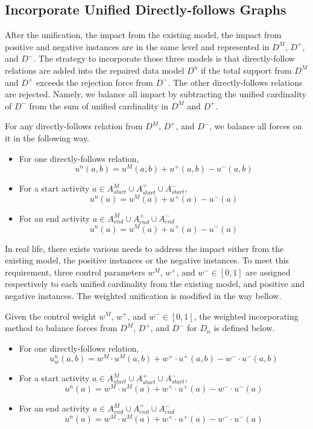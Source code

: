 \subsection{Incorporate Unified Directly-follows Graphs}
After the unification, the impact from the existing model, the impact from positive and negative instances are in the same level and represented in $D^M$, $D^+$, and $D^-$. 
The strategy to incorporate those three models is that directly-follow relations are added into the repaired data model $D^n$ if the total support from $D^M$ and $D^+$ exceeds the rejection force from $D^-$. The other directly-follows relations are rejected. Namely, we balance all impact by subtracting the unified cardinality of $D^-$ from the sum of unified cardinality in $D^M$ and $D^+$.
\begin{definition} For any directly-follows relation from $D^M$, $D^+$, and $D^-$, we balance all forces on it in the following way. 
	\begin{itemize}
		\item For one directly-follows relation, \[ u^{n}(a,b) =  u^{M}(a,b)+ u^{+}(a,b)  - u^{-}(a,b) \] 
		\item For a start activity $a \in A^{M}_{start} \cup A^{+}_{start} \cup A^{-}_{start}$,
		\[ u^{n}(a) =  u^{M}(a)+ u^{+}(a)  - u^{-}(a)\]
		\item For an end activity $a \in A^{M}_{end} \cup A^{+}_{end} \cup A^{-}_{end}$
		\[ u^{n}(a) =  u^{M}(a)+ u^{+}(a)  - u^{-}(a)  \]
	\end{itemize}	
\end{definition}
In real life, there exists various needs to address the impact either from the existing model, the positive instances or the negative instances. To meet this requirement, three control parameters $w^{M}$, $w^{+}$, and $w^{-} \in [0,1]$ are assigned respectively to each unified cardinality from the existing model, and positive and negative instances. The weighted unification is modified in the way bellow. 
\begin{definition}
Given the control weight $w^{M}$, $w^{+}$, and $w^{-} \in [0,1]$, the weighted incorporating method to balance forces from $D^M$, $D^+$, and $D^-$ for $D_{n}$ is defined below.
\begin{itemize}
	\item For one directly-follows relation, \[ u^{n}_{w}(a,b) =  w^{M} \cdot u^{M}(a,b)+ w^{+} \cdot u^{+}(a,b)  - w^{-} \cdot u^{-}(a,b) \] 
	\item For a start activity $a \in A^{M}_{start} \cup A^{+}_{start} \cup A^{-}_{start}$,
	\[ u^{n}(a) =  w^{M} \cdot u^{M}(a)+ w^{+} \cdot u^{+}(a)  - w^{-} \cdot u^{-}(a)\]
	\item For an end activity $a \in A^{M}_{end} \cup A^{+}_{end} \cup A^{-}_{end}$
	\[ u^{n}(a) =  w^{M} \cdot u^{M}(a)+ w^{+} \cdot u^{+}(a)  - w^{-} \cdot u^{-}(a)  \]
\end{itemize}	
\end{definition}

